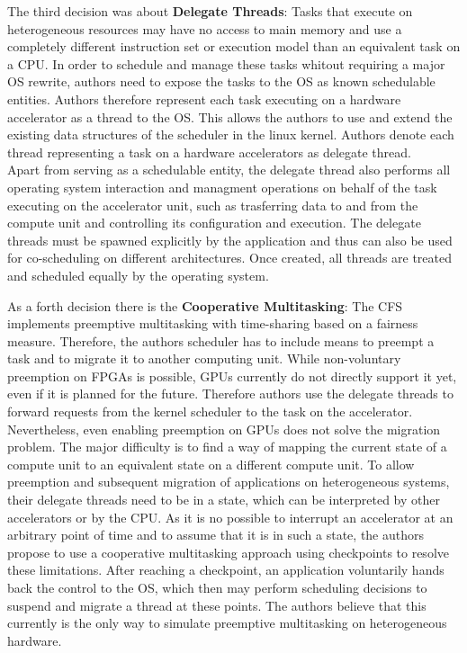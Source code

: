 \documentclass[a4paper,13pt]{article}
\begin{document}
\begin{multicols}{2}
The third decision was about {\bf Delegate Threads}: Tasks that execute on heterogeneous resources may have
no access to main memory and use a completely different instruction set or execution model than an
equivalent task on a CPU. In order to schedule and manage these tasks whitout requiring a major OS
rewrite, authors need to expose the tasks to the OS as known schedulable entities. Authors therefore represent
each task executing on a hardware accelerator  as a thread  to the OS. This allows the authors to use and 
extend  the existing data structures of the scheduler  in the linux kernel. Authors denote each thread 
representing a task on a hardware accelerators as delegate thread.\\
Apart from serving as a schedulable entity, the delegate thread also performs all operating system
interaction and managment operations on behalf of the task executing on the accelerator unit, such as
trasferring  data to and from the compute unit and controlling its configuration and execution.
The delegate threads must be spawned explicitly by the application and thus can also be used for
co-scheduling on different architectures. Once created, all threads are treated and scheduled equally
by the operating system.

As a forth decision there is the {\bf Cooperative Multitasking}: The CFS implements preemptive multitasking
with time-sharing based on a fairness measure. Therefore, the authors scheduler has to include means to 
preempt a task and to migrate it to another computing unit. While non-voluntary preemption on FPGAs is
possible, GPUs currently do not directly support it yet, even if it is planned for the future.
Therefore authors use the delegate threads to forward requests from the kernel scheduler to the task on 
the accelerator.
Nevertheless, even enabling preemption on GPUs does not solve the migration problem. The major 
difficulty is to find a way of mapping  the current  state of a compute unit to an equivalent state
on a different compute unit. To allow preemption and subsequent migration of applications on 
heterogeneous systems, their delegate threads need to be in a state, which can be interpreted by other
accelerators or by the CPU. As it is no possible to interrupt an accelerator at an arbitrary point
of time and to assume that it is in such a state, the authors propose to use a cooperative multitasking 
approach using checkpoints  to resolve these limitations. After reaching a checkpoint, an application
voluntarily hands back the control to the OS, which then may perform scheduling decisions to suspend 
and migrate a thread at these points. The authors believe that this currently is the only way to 
simulate preemptive  multitasking on heterogeneous hardware.


\end{multicols}
\end{document}
